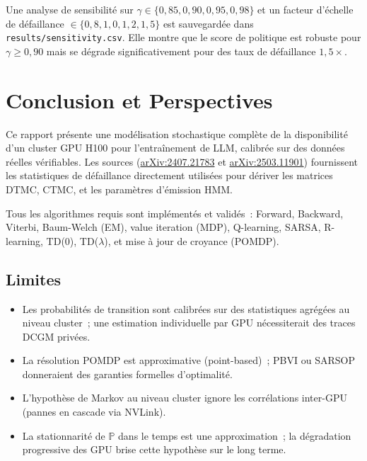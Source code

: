 \documentclass[12pt,a4paper]{article}
\begin{document}
Une analyse de sensibilité sur $\gamma \in \{0{,}85, 0{,}90, 0{,}95, 0{,}98\}$
et un facteur d'échelle de défaillance $\in \{0{,}8, 1{,}0, 1{,}2, 1{,}5\}$
est sauvegardée dans \texttt{results/sensitivity.csv}.
Elle montre que le score de politique est robuste pour $\gamma \geq 0{,}90$
mais se dégrade significativement pour des taux de défaillance $1{,}5\times$.

\section{Conclusion et Perspectives}

Ce rapport présente une modélisation stochastique complète de la disponibilité d'un cluster
GPU H100 pour l'entraînement de LLM, calibrée sur des données réelles vérifiables.
Les sources (\href{https://arxiv.org/pdf/2407.21783}{arXiv:2407.21783}
et \href{https://arxiv.org/pdf/2503.11901}{arXiv:2503.11901}) fournissent les statistiques
de défaillance directement utilisées pour dériver les matrices DTMC, CTMC,
et les paramètres d'émission HMM.

Tous les algorithmes requis sont implémentés et validés~:
Forward, Backward, Viterbi, Baum-Welch (EM), value iteration (MDP),
Q-learning, SARSA, R-learning, TD(0), TD($\lambda$), et mise à jour de croyance (POMDP).

\subsection{Limites}

\begin{itemize}
  \item Les probabilités de transition sont calibrées sur des statistiques agrégées au niveau cluster~;
        une estimation individuelle par GPU nécessiterait des traces DCGM privées.
  \item La résolution POMDP est approximative (point-based)~;
        PBVI ou SARSOP donneraient des garanties formelles d'optimalité.
  \item L'hypothèse de Markov au niveau cluster ignore les corrélations inter-GPU
        (pannes en cascade via NVLink).
  \item La stationnarité de $\mathbb{P}$ dans le temps est une approximation~;
        la dégradation progressive des GPU brise cette hypothèse sur le long terme.
\end{itemize}
\end{document}
